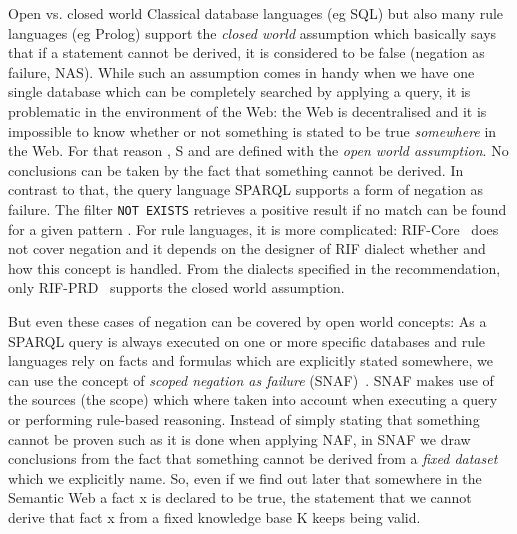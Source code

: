 \begin{paragraph}{Open vs. closed world}
 Classical database languages (eg SQL)  but also many rule languages (eg Prolog) support the \emph{closed world} assumption which basically says that if a statement cannot 
be derived, 
it is considered to be false (negation as failure, NAS). While such an assumption comes in handy when we have one single database which can be completely searched by applying a query, 
it is problematic 
in the environment of the Web: the Web is decentralised and it is impossible to know whether or not something is stated to be true \emph{somewhere} in the Web.
For that reason \rdf, \rdf{}S and \owl are defined with the \emph{open world assumption}. No conclusions can be taken by the fact that something cannot be derived. 
In contrast to that, the query language SPARQL supports a form of negation as failure. The
filter \texttt{NOT EXISTS} retrieves a positive result if no match can be found for a given pattern \cite[Section 8]{sparql}.
For rule languages, it is more complicated:
RIF-Core~\cite{rifcore} does not cover negation and it depends on the designer of RIF dialect whether and how this concept is handled. From the dialects 
specified in the \wwwc recommendation, only RIF-PRD~\cite{rifprd} supports the closed world assumption. 

But even these cases of negation can be covered by open world concepts: As a SPARQL query is always executed on one or more specific databases and 
rule languages rely on facts and formulas which are explicitly stated somewhere, we  
can use the concept of \emph{scoped negation as failure} (SNAF)~\cite{rearch,snaf1,snaf2}. SNAF makes use of the sources (the scope) 
which where taken into account when executing a 
query or performing rule-based reasoning. Instead of simply stating that something cannot be proven such as it is done when applying NAF, in SNAF  we
draw conclusions from the fact that something cannot be derived from a \emph{fixed dataset} which we explicitly name. 
So, even if we find out later that somewhere in the Semantic Web a fact x is declared to be true, 
the statement that we cannot derive that fact x from a fixed knowledge base K 
keeps being valid.  
\end{paragraph}

